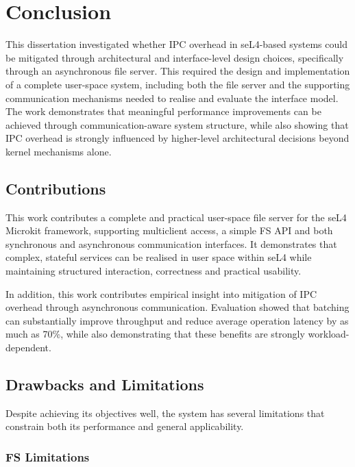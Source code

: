 \chapter{Conclusion}
\label{cha:conclusion}

This dissertation investigated whether IPC overhead in seL4-based systems could be mitigated through architectural and interface-level design choices, specifically through an asynchronous file server. This required the design and implementation of a complete user-space system, including both the file server and the supporting communication mechanisms needed to realise and evaluate the interface model. The work demonstrates that meaningful performance improvements can be achieved through communication-aware system structure, while also showing that IPC overhead is strongly influenced by higher-level architectural decisions beyond kernel mechanisms alone.

\section{Contributions}

This work contributes a complete and practical user-space file server for the seL4 Microkit framework, supporting multiclient access, a simple FS API and both synchronous and asynchronous communication interfaces. It demonstrates that complex, stateful services can be realised in user space within seL4 while maintaining structured interaction, correctness and practical usability.

In addition, this work contributes empirical insight into mitigation of IPC overhead through asynchronous communication. Evaluation showed that batching can substantially improve throughput and reduce average operation latency by as much as 70\%, while also demonstrating that these benefits are strongly workload-dependent.

\section{Drawbacks and Limitations}

Despite achieving its objectives well, the system has several limitations that constrain both its performance and general applicability.

\subsection{FS Limitations}

